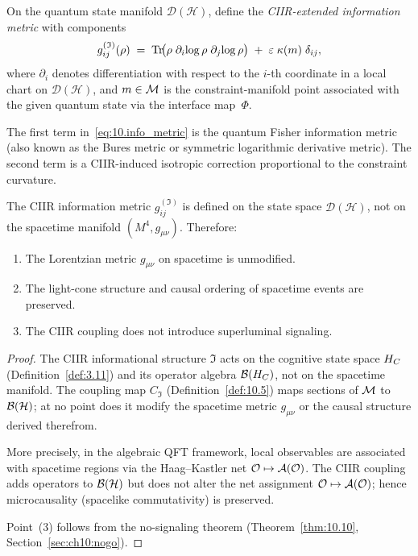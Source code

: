 \begin{definition}
\label{def:10.13}
On the quantum state manifold $\mathcal{D}(\mathcal{H})$, define the
\emph{CIIR-extended information metric} with components
\begin{equation}
\label{eq:10.info_metric}
  g_{ij}^{(\mathfrak{I})}(\rho)
  \;=\;
  \mathrm{Tr}\!\bigl(\rho\;\partial_i\!\log\rho\;\partial_j\!\log\rho\bigr)
  \;+\;
  \varepsilon\;\kappa(m)\;\delta_{ij},
\end{equation}
where $\partial_i$ denotes differentiation with respect to the $i$-th
coordinate in a local chart on $\mathcal{D}(\mathcal{H})$, and
$m\in\mathcal{M}$ is the constraint-manifold point associated with the given
quantum state via the interface map~$\Phi$.
\end{definition}

\begin{remark}
\label{rem:10.4}
The first term in~\eqref{eq:10.info_metric} is the quantum Fisher
information metric (also known as the Bures metric or symmetric
logarithmic derivative metric).  The second term is a CIIR-induced
isotropic correction proportional to the constraint curvature.
\end{remark}

\begin{theorem}
\label{thm:10.7}
The CIIR information metric $g_{ij}^{(\mathfrak{I})}$ is defined on
the state space $\mathcal{D}(\mathcal{H})$, not on the spacetime
manifold $(M^4, g_{\mu\nu})$.  Therefore:
\begin{enumerate}
  \item The Lorentzian metric $g_{\mu\nu}$ on spacetime is unmodified.
  \item The light-cone structure and causal ordering of spacetime events
        are preserved.
  \item The CIIR coupling does not introduce superluminal signaling.
\end{enumerate}
\end{theorem}

\begin{proof}
The CIIR informational structure $\mathfrak{I}$ acts on the cognitive
state space $H_C$ (Definition~\ref{def:3.11}) and its operator algebra
$\mathcal{B}(H_C)$, not on the spacetime manifold.  The coupling map
$C_{\mathfrak{I}}$ (Definition~\ref{def:10.5}) maps sections of $\mathcal{M}$
to $\mathcal{B}(\mathcal{H})$; at no point does it modify the spacetime
metric $g_{\mu\nu}$ or the causal structure derived therefrom.

More precisely, in the algebraic QFT framework, local observables are
associated with spacetime regions via the Haag--Kastler net
$\mathcal{O}\mapsto\mathcal{A}(\mathcal{O})$.  The CIIR coupling adds
operators to $\mathcal{B}(\mathcal{H})$ but does not alter the net assignment
$\mathcal{O}\mapsto\mathcal{A}(\mathcal{O})$; hence microcausality
(spacelike commutativity) is preserved.

Point~(3) follows from the no-signaling theorem
(Theorem~\ref{thm:10.10}, Section~\ref{sec:ch10:nogo}).
\end{proof}

